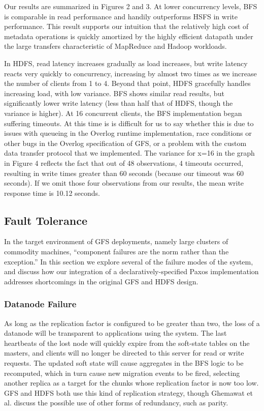 \documentclass{article}
\begin{document}
Our results are summarized in Figures 2 and 3.  At lower concurrency levels, BFS is comparable in read performance and handily outperforms HSFS in write performance.  This result supports our intuition that the relatively high cost of metadata operations is quickly amortized by the highly efficient datapath under the large transfers characteristic of MapReduce and Hadoop workloads.

In HDFS, read latency increases gradually as load increases, but write latency reacts very quickly to concurrency, increasing by almost two times as we increase the number of clients from 1 to 4.  Beyond that point, HDFS gracefully handles increasing load, with low variance.  BFS shows similar read results, but significantly lower write latency (less than half that of HDFS, though the variance is higher).  At 16 concurrent clients, the BFS implementation began suffering timeouts.  At this time is is difficult for us to say whether this is due to issues with queueing in the Overlog runtime implementation, race conditions or other bugs in the Overlog  specification of GFS, or a problem with the custom data transfer protocol that we implemented.  The variance for x=16 in the graph in Figure 4 reflects the fact that out of 48 observations, 4 timeouts occurred, resulting in write times greater than 60 seconds (because our timeout was 60 seconds).  If we omit those four observations from our results, the mean write response time is 10.12 seconds.

\subsection{Fault Tolerance}
In the target environment of GFS deployments, namely large clusters of commodity machines, ``component failures are the norm rather than the exception.''  In this section we explore several of the failure modes of the system, and discuss how our integration of a declaratively-specified Paxos implementation addresses shortcomings in the original GFS and HDFS design.

\subsubsection{Datanode Failure}
As long as the replication factor is configured to be greater than two, the loss of a datanode will be transparent to applications using the system.  The last heartbeats of the lost node will quickly expire from the soft-state tables on the masters, and clients will no longer be directed to this server for read or write requests.  The updated soft state will cause aggregates in the BFS logic to be recomputed, which in turn cause new migration events to be fired, selecting another replica as a target for the chunks whose replication factor is now too low.  GFS and HDFS both use this kind of replication strategy, though Ghemawat et al. discuss the possible use of other forms of redundancy, such as parity.
\end{document}
